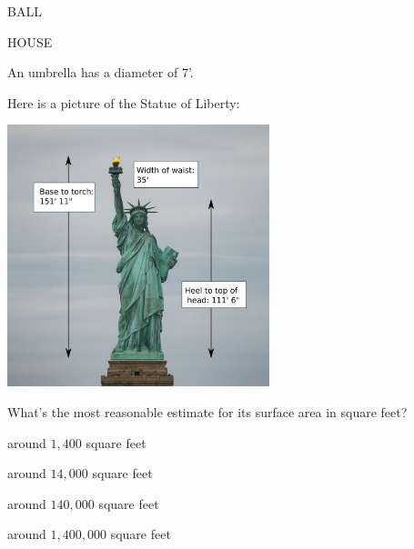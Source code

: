\documentclass{ximera}
\author{Bart Snapp}
\begin{document}
\maketitle



\begin{exercise}
BALL
\end{exercise}
\vfill

\begin{exercise}
 HOUSE
\end{exercise}
\vfill


\begin{exercise}
  An umbrella has a diameter of $7$'. 
\end{exercise}
\vfill


\begin{exercise}
  Here is a picture of the Statue of Liberty:
  \begin{center}
    \includegraphics[width=3in]{statueLiberty.png}
  \end{center}
  What's the most reasonable estimate for its surface area in square feet?
  \begin{enumerate}\begin{multicols}{2}
    \item around $1,400$ square feet
    \item around $14,000$ square feet
    \item around $140,000$ square feet
    \item around $1,400,000$ square feet
    \end{multicols}
  \end{enumerate}
\end{exercise}
\end{document}
